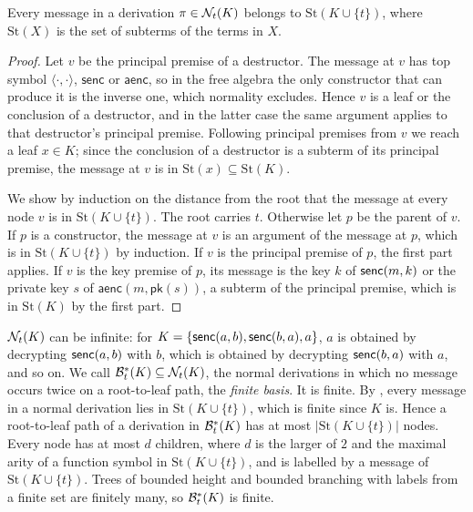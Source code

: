 \begin{lemma}\label{lem:subterm}
Every message in a derivation $\pi\in\mathcal{N}_t(K)$ belongs to $\mathrm{St}(K\cup\{t\})$, where \(\mathrm{St}(X)\) is the set of subterms of the terms in \(X\).
\end{lemma}
\begin{proof}
Let $v$ be the principal premise of a destructor. The message at $v$ has top symbol $\langle\cdot,\cdot\rangle$, $\mathsf{senc}$ or $\mathsf{aenc}$, so in the free algebra the only constructor that can produce it is the inverse one, which normality excludes. Hence $v$ is a leaf or the conclusion of a destructor, and in the latter case the same argument applies to that destructor's principal premise. Following principal premises from $v$ we reach a leaf $x\in K$; since the conclusion of a destructor is a subterm of its principal premise, the message at $v$ is in $\mathrm{St}(x)\subseteq\mathrm{St}(K)$.

We show by induction on the distance from the root that the message at every node $v$ is in $\mathrm{St}(K\cup\{t\})$. The root carries $t$. Otherwise let $p$ be the parent of $v$. If $p$ is a constructor, the message at $v$ is an argument of the message at $p$, which is in $\mathrm{St}(K\cup\{t\})$ by induction. If $v$ is the principal premise of $p$, the first part applies. If $v$ is the key premise of $p$, its message is the key $k$ of $\mathsf{senc}(m,k)$ or the private key $s$ of $\mathsf{aenc}(m,\mathsf{pk}(s))$, a subterm of the principal premise, which is in $\mathrm{St}(K)$ by the first part.
\end{proof}

\begin{remark}\label{rem:finite}
$\mathcal{N}_t(K)$ can be infinite: for $K=\{\mathsf{senc}(a,b),\mathsf{senc}(b,a),a\}$, $a$ is obtained by decrypting $\mathsf{senc}(a,b)$ with $b$, which is obtained by decrypting $\mathsf{senc}(b,a)$ with $a$, and so on. We call $\mathcal{B}^*_t(K)\subseteq\mathcal{N}_t(K)$, the normal derivations in which no message occurs twice on a root-to-leaf path, the \emph{finite basis}. It is finite. By , every message in a normal derivation lies in $\mathrm{St}(K\cup\{t\})$, which is finite since $K$ is. Hence a root-to-leaf path of a derivation in $\mathcal{B}^*_t(K)$ has at most $|\mathrm{St}(K\cup\{t\})|$ nodes. Every node has at most $d$ children, where $d$ is the larger of $2$ and the maximal arity of a function symbol in $\mathrm{St}(K\cup\{t\})$, and is labelled by a message of $\mathrm{St}(K\cup\{t\})$. Trees of bounded height and bounded branching with labels from a finite set are finitely many, so $\mathcal{B}^*_t(K)$ is finite.
\end{remark}

